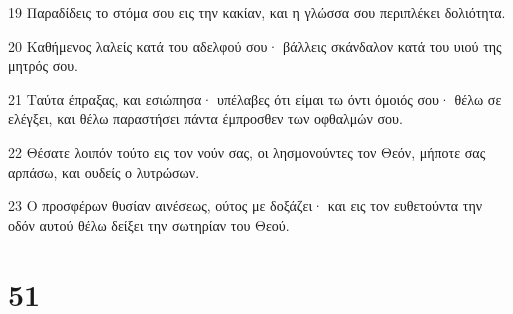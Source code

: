 \par 19 Παραδίδεις το στόμα σου εις την κακίαν, και η γλώσσα σου περιπλέκει δολιότητα.
\par 20 Καθήμενος λαλείς κατά του αδελφού σου· βάλλεις σκάνδαλον κατά του υιού της μητρός σου.
\par 21 Ταύτα έπραξας, και εσιώπησα· υπέλαβες ότι είμαι τω όντι όμοιός σου· θέλω σε ελέγξει, και θέλω παραστήσει πάντα έμπροσθεν των οφθαλμών σου.
\par 22 Θέσατε λοιπόν τούτο εις τον νούν σας, οι λησμονούντες τον Θεόν, μήποτε σας αρπάσω, και ουδείς ο λυτρώσων.
\par 23 Ο προσφέρων θυσίαν αινέσεως, ούτος με δοξάζει· και εις τον ευθετούντα την οδόν αυτού θέλω δείξει την σωτηρίαν του Θεού.

\chapter{51}

